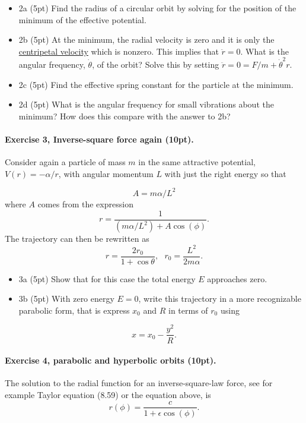 \documentclass[%
oneside,                 %
final,                   %
10pt]{article}
\begin{document}
\begin{itemize}
\item 2a (5pt)  Find the radius of a circular orbit by solving for the position of the minimum of the effective potential. 

\item 2b (5pt) At the minimum, the radial velocity is zero and it is only the \href{{https://en.wikipedia.org/wiki/Centripetal_force}}{centripetal velocity} which is nonzero. This implies that $\ddot{r}=0$.  What is the angular frequency, $\dot{\theta}$, of the orbit? Solve this by setting $\ddot{r}=0=F/m+\dot{\theta}^2r$.

\item 2c (5pt) Find the effective spring constant for the particle at the minimum.

\item 2d (5pt) What is the angular frequency for small vibrations about the minimum? How does this compare with the answer to 2b?
\end{itemize}

\noindent
\paragraph{Exercise 3, Inverse-square force again (10pt).}
Consider again a  particle of mass $m$ in the same attractive potential, $V(r)=-\alpha/r$, with angular momentum $L$ with just the right energy so that

\[
A=m\alpha/L^2
\]
where $A$ comes from the expression
\[
r=\frac{1}{(m\alpha/L^2)+A\cos{(\phi)}}.
\]
The trajectory can then be rewritten as
\[
r=\frac{2r_0}{1+\cos\theta},~~~r_0=\frac{L^2}{2m\alpha}.
\]

\begin{itemize}
\item 3a (5pt) Show that for this case the total energy $E$ approaches zero.

\item 3b (5pt) With zero energy $E=0$, write this trajectory in a more recognizable parabolic form, that is express $x_0$ and $R$ in terms of $r_0$ using 
\end{itemize}

\noindent
\[
x=x_0-\frac{y^2}{R}.
\]

\paragraph{Exercise 4, parabolic and hyperbolic orbits (10pt).}
The solution to the radial function for an inverse-square-law force, see for example Taylor equation (8.59) or the equation above, is
\[
r(\phi) = \frac{c}{1+\epsilon\cos{(\phi)}}.
\]
\end{document}
